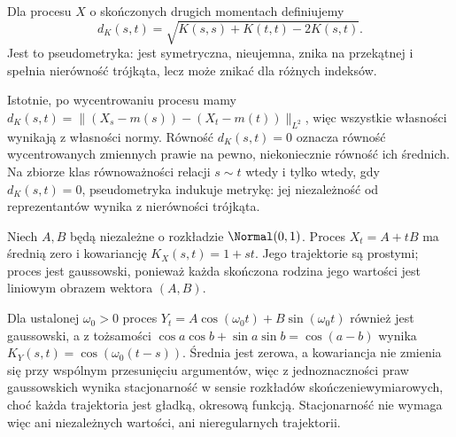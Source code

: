 \begin{definicja}
Dla procesu $X$ o skończonych drugich momentach
definiujemy
\[
d_K(s,t)=\sqrt{K(s,s)+K(t,t)-2K(s,t)}.
\]
Jest to pseudometryka: jest symetryczna, nieujemna,
znika na przekątnej i spełnia nierówność trójkąta,
lecz może znikać dla różnych indeksów.
\end{definicja}
Istotnie, po wycentrowaniu procesu mamy
$d_K(s,t)=\|(X_s-m(s))-(X_t-m(t))\|_{L^2}$,
więc wszystkie własności wynikają z własności normy.
Równość $d_K(s,t)=0$ oznacza równość wycentrowanych
zmiennych prawie na pewno, niekoniecznie równość
ich średnich. Na zbiorze klas równoważności relacji
$s\sim t$ wtedy i tylko wtedy, gdy $d_K(s,t)=0$,
pseudometryka indukuje metrykę: jej niezależność
od reprezentantów wynika z nierówności trójkąta.

\begin{przyklad}
Niech $A,B$ będą niezależne o rozkładzie $\Normal(0,1)$.
Proces $X_t=A+tB$ ma średnią zero i kowariancję
$K_X(s,t)=1+st$. Jego trajektorie są prostymi; proces jest
gaussowski, ponieważ każda skończona rodzina jego wartości
jest liniowym obrazem wektora $(A,B)$.

Dla ustalonej $\omega_0>0$ proces
$Y_t=A\cos(\omega_0t)+B\sin(\omega_0t)$ również jest gaussowski,
a z tożsamości $\cos a\cos b+\sin a\sin b=\cos(a-b)$
wynika $K_Y(s,t)=\cos(\omega_0(t-s))$. Średnia jest zerowa,
a kowariancja nie zmienia się przy wspólnym przesunięciu
argumentów, więc z jednoznaczności praw gaussowskich
wynika stacjonarność w sensie rozkładów skończeniewymiarowych, choć każda trajektoria
jest gładką, okresową funkcją. Stacjonarność nie wymaga więc
ani niezależnych wartości, ani nieregularnych trajektorii.
\end{przyklad}

